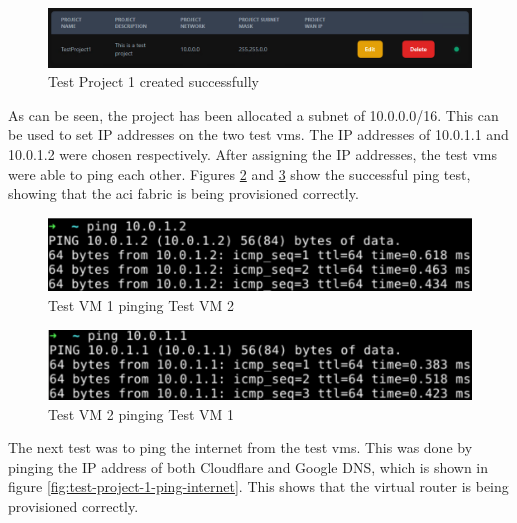 \begin{figure}[H]
    \centering
    \includegraphics[scale=0.8]{images/test-project-1.png}
    \caption{Test Project 1 created successfully}
    \label{fig:test-project-1}
\end{figure}

As can be seen, the project has been allocated a subnet of 10.0.0.0/16. This can be used to set IP addresses on the two test \gls{vm}s. The IP addresses of 10.0.1.1 and 10.0.1.2 were chosen respectively. After assigning the IP addresses, the test \gls{vm}s were able to ping each other. Figures \ref{fig:test-project-1-ping-1} and \ref{fig:test-project-1-ping-2} show the successful ping test, showing that the \gls{aci} fabric is being provisioned correctly.

\begin{figure}[H]
    \centering
    \includegraphics[scale=0.7]{images/test-project-1-ping.png}
    \caption{Test VM 1 pinging Test VM 2}
    \label{fig:test-project-1-ping-1}
\end{figure}

\begin{figure}[H]
    \centering
    \includegraphics[scale=0.7]{images/test-project-1-ping-2.png}
    \caption{Test VM 2 pinging Test VM 1}
    \label{fig:test-project-1-ping-2}
\end{figure}

The next test was to ping the internet from the test \gls{vm}s. This was done by pinging the IP address of both Cloudflare and Google DNS, which is shown in figure \ref{fig:test-project-1-ping-internet}. This shows that the virtual router is being provisioned correctly.

